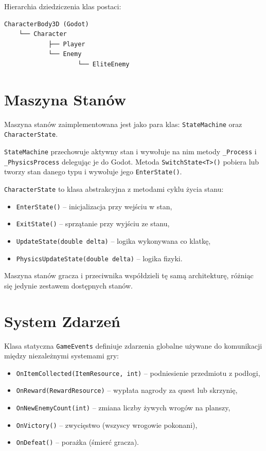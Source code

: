 Hierarchia dziedziczenia klas postaci:

\begin{verbatim}
CharacterBody3D (Godot)
    └── Character
            ├── Player
            └── Enemy
                    └── EliteEnemy
\end{verbatim}

\section{Maszyna Stanów}

Maszyna stanów zaimplementowana jest jako para klas: \texttt{StateMachine} oraz \texttt{CharacterState}.

\texttt{StateMachine} przechowuje aktywny stan i wywołuje na nim metody \texttt{\_Process} i \texttt{\_PhysicsProcess} delegując je do Godot. Metoda \texttt{SwitchState<T>()} pobiera lub tworzy stan danego typu i wywołuje jego \texttt{EnterState()}.

\texttt{CharacterState} to klasa abstrakcyjna z metodami cyklu życia stanu:
\begin{itemize}
    \item \texttt{EnterState()} – inicjalizacja przy wejściu w stan,
    \item \texttt{ExitState()} – sprzątanie przy wyjściu ze stanu,
    \item \texttt{UpdateState(double delta)} – logika wykonywana co klatkę,
    \item \texttt{PhysicsUpdateState(double delta)} – logika fizyki.
\end{itemize}

Maszyna stanów gracza i przeciwnika współdzieli tę samą architekturę, różniąc się jedynie zestawem dostępnych stanów.

\section{System Zdarzeń}

Klasa statyczna \texttt{GameEvents} definiuje zdarzenia globalne używane do komunikacji między niezależnymi systemami gry:

\begin{itemize}
    \item \texttt{OnItemCollected(ItemResource, int)} – podniesienie przedmiotu z podłogi,
    \item \texttt{OnReward(RewardResource)} – wypłata nagrody za quest lub skrzynię,
    \item \texttt{OnNewEnemyCount(int)} – zmiana liczby żywych wrogów na planszy,
    \item \texttt{OnVictory()} – zwycięstwo (wszyscy wrogowie pokonani),
    \item \texttt{OnDefeat()} – porażka (śmierć gracza).
\end{itemize}

